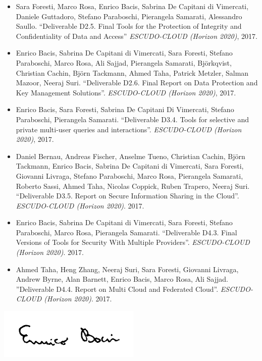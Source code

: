 \documentclass[a4paper]{article}
\begin{document}
\begin{sloppy}
\begin{itemize}
		\item Sara Foresti, Marco Rosa, Enrico Bacis, Sabrina De Capitani di Vimercati, Daniele Guttadoro, Stefano Paraboschi, Pierangela Samarati, Alessandro Saullo. ``Deliverable D2.5. Final Tools for the Protection of Integrity and Confidentiality of Data and Access'' {\em ESCUDO-CLOUD (Horizon 2020)}, 2017.

		\item Enrico Bacis, Sabrina De Capitani di Vimercati, Sara Foresti, Stefano Paraboschi, Marco Rosa, Ali Sajjad, Pierangela Samarati, Bj\"{o}rkqvist, Christian Cachin, Bj\"{o}rn Tackmann, Ahmed Taha, Patrick Metzler, Salman Mazoor, Neeraj Suri. ``Deliverable D2.6. Final Report on Data Protection and Key Management Solutions''. {\em ESCUDO-CLOUD (Horizon 2020)}, 2017.

		\item Enrico Bacis, Sara Foresti, Sabrina De Capitani Di Vimercati, Stefano Paraboschi, Pierangela Samarati. ``Deliverable D3.4. Tools for selective and private multi-user queries and interactions''. {\em ESCUDO-CLOUD (Horizon 2020)}, 2017.

		\item Daniel Bernau, Andreas Fischer, Anselme Tueno, Christian Cachin, Bj\"{o}rn Tackmann, Enrico Bacis, Sabrina De Capitani di Vimercati, Sara Foresti, Giovanni Livraga, Stefano Paraboschi, Marco Rosa, Pierangela Samarati, Roberto Sassi, Ahmed Taha, Nicolas Coppick, Ruben Trapero, Neeraj Suri. ``Deliverable D3.5. Report on Secure Information Sharing in the Cloud''. {\em ESCUDO-CLOUD (Horizon 2020)}. 2017.

		\item Enrico Bacis, Sabrina De Capitani di Vimercati, Sara Foresti, Stefano Paraboschi, Marco Rosa, Pierangela Samarati. ``Deliverable D4.3. Final Versions of Tools for Security With Multiple Providers''. {\em ESCUDO-CLOUD (Horizon 2020)}. 2017.

		\item Ahmed Taha, Heng Zhang, Neeraj Suri, Sara Foresti, Giovanni Livraga, Andrew Byrne, Alan Barnett, Enrico Bacis, Marco Rosa, Ali Sajjad. ''Deliverable D4.4. Report on Multi Cloud and Federated Cloud''. {\em ESCUDO-CLOUD (Horizon 2020)}. 2017.
	\end{itemize}

\end{sloppy}


\vspace{30pt}
\includegraphics[right]{signature}
\end{document}
